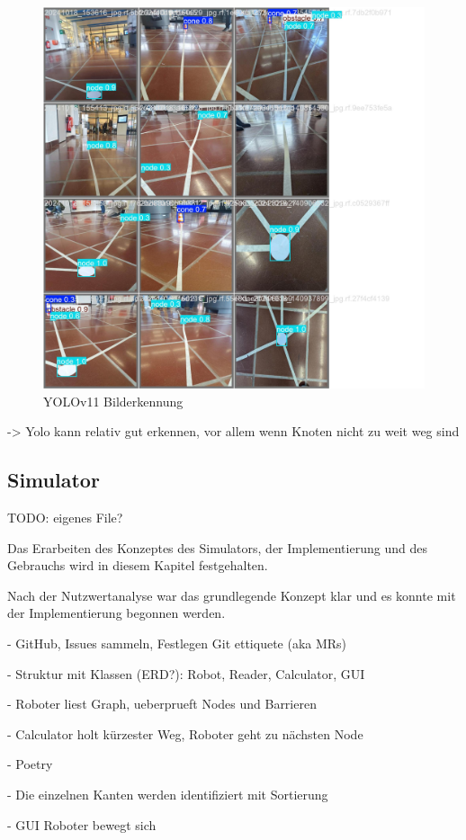 \begin{figure}[H]
\centering
\includegraphics[width=\textwidth -30mm]{assets/informatik-prototyp/yolo/recognized-images.jpeg}
\caption{YOLOv11 Bilderkennung}
\label{fig:img-recognition-yolo}
\end{figure}

-> Yolo kann relativ gut erkennen, vor allem wenn Knoten nicht zu weit weg sind

\subsection{Simulator}

TODO: eigenes File?

Das Erarbeiten des Konzeptes des Simulators, der Implementierung und des Gebrauchs wird in diesem Kapitel festgehalten.

Nach der Nutzwertanalyse war das grundlegende Konzept klar und es konnte mit der Implementierung begonnen werden.

- GitHub, Issues sammeln, Festlegen Git ettiquete (aka MRs)

- Struktur mit Klassen (ERD?): Robot, Reader, Calculator, GUI

- Roboter liest Graph, ueberprueft Nodes und Barrieren

- Calculator holt kürzester Weg, Roboter geht zu nächsten Node

- Poetry

- Die einzelnen Kanten werden identifiziert mit Sortierung

- GUI Roboter bewegt sich
